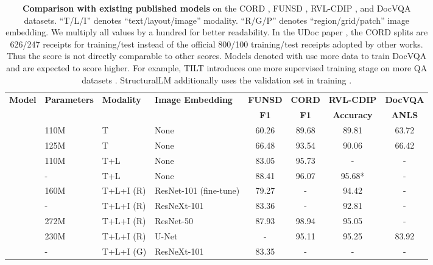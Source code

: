 \documentclass[sigconf]{acmart}
\newcommand{\demph}[1]{\textcolor{demphcolor}{#1}}
\begin{document}
\begin{table*}[t]
    \centering
\caption{\textbf{Comparison with existing published models} on the CORD \protect\cite{park2019cord}, FUNSD \protect\cite{jaume2019funsd}, RVL-CDIP \protect\cite{harley2015icdar}, and DocVQA \protect\cite{mathew2021docvqa} datasets.
    ``T/L/I'' denotes ``text/layout/image'' modality. ``R/G/P'' denotes ``region/grid/patch'' image embedding.
    We multiply all values by a hundred for better readability.
    In the UDoc paper \protect\cite{gu2021unidoc}, the CORD splits are 626/247 receipts for training/test instead of the official 800/100 training/test receipts adopted by other works. Thus the score is not directly comparable to other scores.
    Models denoted with  use more data to train DocVQA and are expected to score higher. For example, TILT introduces one more supervised training stage on more QA datasets \protect\cite{Powalski2021GoingFB}. StructuralLM additionally uses the validation set in training \protect\cite{Li2021StructuralLMSP}.
    }
    \label{tab:sota}
    \begin{tabular}{llllcccc}
    \toprule
    \multirow{2}{*}{\bf Model} & \multirow{2}{*}{\bf Parameters} & \multirow{2}{*}{\bf Modality} & \multirow{2}{*}{\bf Image Embedding} & \bf FUNSD & \bf CORD & \bf RVL-CDIP  & \bf DocVQA  \\
     & & & & \bf F1  & \bf F1 & \bf Accuracy & \bf ANLS \\
     \midrule
     ~\cite{devlin2019bert} & 110M & T & None & 60.26 & 89.68 &  89.81 & 63.72\\
     ~\cite{liu2019roberta} & 125M & T & None & 66.48 & 93.54 &  90.06 & 66.42\\
     ~\cite{hong2022bros} & 110M & T+L & None & 83.05 & 95.73 &  - & -\\
     ~\cite{wang2022LiLT} & - & T+L & None & 88.41 & 96.07 & 95.68* & - \\
     ~\cite{xu2020layoutlm} & 160M & T+L+I (R) & ResNet-101 (fine-tune) & 79.27 & - & 94.42 & -\\
     ~\cite{li2021selfdoc} & - & T+L+I (R) & ResNeXt-101 & 83.36 & - & 92.81 & -\\
     ~\cite{gu2021unidoc} & 272M & T+L+I (R) & ResNet-50 & 87.93 & \demph{98.94}  & 95.05 & -\\
     ~\cite{Powalski2021GoingFB} & 230M & T+L+I (R) & U-Net & - & 95.11 & 95.25 & \demph{83.92}\\
     ~\cite{gu2022xylayoutlm} & - & T+L+I (G) & ResNeXt-101 & 83.35 & - & - & -\\

\end{tabular}
\end{table*}
\end{document}

